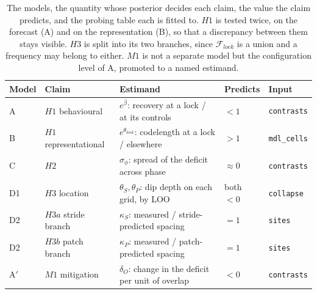 \begin{table}[!tp]
    \centering
    \small
    \begin{tabular}{@{}lllll@{}}
        \toprule
        \textbf{Model} & \textbf{Claim} & \textbf{Estimand} & \textbf{Predicts} & \textbf{Input} \\
        \midrule
        A  & $H1$ behavioural      & $e^{\bar\beta}$: recovery at a lock / at its controls   & $<1$        & \texttt{contrasts} \\
        B  & $H1$ representational & $e^{\theta_{lock}}$: codelength at a lock / elsewhere   & $>1$        & \texttt{mdl\_cells} \\
        C  & $H2$                  & $\sigma_\phi$: spread of the deficit across phase       & $\approx 0$ & \texttt{contrasts} \\
        D1 & $H3$ location         & $\theta_S,\theta_P$: dip depth on each grid, by LOO     & both $<0$   & \texttt{collapse} \\
        D2 & $H3a$ stride branch   & $\kappa_S$: measured / stride-predicted spacing         & $=1$        & \texttt{sites} \\
        D2 & $H3b$ patch branch    & $\kappa_P$: measured / patch-predicted spacing          & $=1$        & \texttt{sites} \\
        A$'$ & $M1$ mitigation     & $\delta_O$: change in the deficit per unit of overlap   & $<0$        & \texttt{contrasts} \\
        \bottomrule
    \end{tabular}
    \caption{The models, the quantity whose posterior decides each claim, the value the claim predicts, and the probing table each is fitted to. $H1$ is tested twice, on the forecast (A) and on the representation (B), so that a discrepancy between them stays visible. $H3$ is split into its two branches, since $\mathcal F_{lock}$ is a union and a frequency may belong to either. $M1$ is not a separate model but the configuration level of A, promoted to a named estimand.}
    \label{tab:bayesModels}
\end{table}
